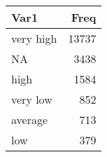 
\begin{tabular}[t]{lr}
\toprule
Var1 & Freq\\
\midrule
very high & 13737\\
NA & 3438\\
high & 1584\\
very low & 852\\
average & 713\\
\addlinespace
low & 379\\
\bottomrule
\end{tabular}